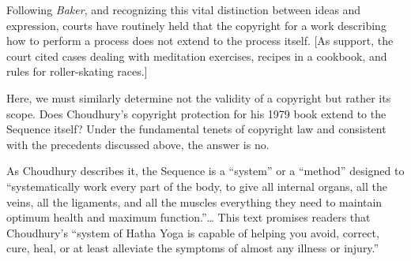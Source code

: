 Following \textit{Baker}, and recognizing this vital distinction between ideas
and expression, courts have routinely held that the  copyright for a work
describing how to perform a process does not extend to the process itself.
[As support, the court cited cases dealing with meditation exercises, recipes in
a cookbook, and rules for roller-skating races.] 

Here, we must similarly determine not the validity of a copyright but rather its
scope.
Does Choudhury's copyright protection for his 1979 book extend to the
Sequence itself? Under the fundamental tenets of copyright law and
consistent with the precedents discussed above, the answer is no.

As Choudhury describes it, the Sequence is a ``system'' or a ``method''
designed to ``systematically work every part of the body, to give all
internal organs, all the veins, all the ligaments, and all the muscles
everything they need to maintain optimum health and maximum function.''\ldots
This text promises readers that Choudhury's ``system of
Hatha Yoga is capable of helping you avoid, correct, cure, heal, or at
least alleviate the symptoms of almost any illness or injury.''

